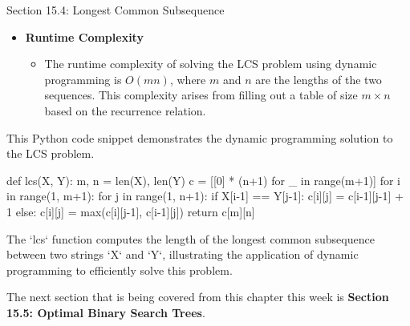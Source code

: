 \begin{notes}{Section 15.4: Longest Common Subsequence}
\begin{itemize}
        \item \textbf{Runtime Complexity}
        \begin{itemize}
            \item The runtime complexity of solving the LCS problem using dynamic programming is $O(mn)$, where $m$ and $n$ are the lengths of the two sequences. This complexity arises from filling 
            out a table of size $m \times n$ based on the recurrence relation.
        \end{itemize}
    \end{itemize}
    
    \begin{highlight}
        This Python code snippet demonstrates the dynamic programming solution to the LCS problem.
    \begin{code}[Python]
    def lcs(X, Y):
        m, n = len(X), len(Y)
        c = [[0] * (n+1) for _ in range(m+1)]
        for i in range(1, m+1):
            for j in range(1, n+1):
                if X[i-1] == Y[j-1]:
                    c[i][j] = c[i-1][j-1] + 1
                else:
                    c[i][j] = max(c[i][j-1], c[i-1][j])
        return c[m][n]
    \end{code}
        The `lcs` function computes the length of the longest common subsequence between two strings `X` and `Y`, illustrating the application of dynamic programming to efficiently solve this problem.
    \end{highlight}      
\end{notes}

The next section that is being covered from this chapter this week is \textbf{Section 15.5: Optimal Binary Search Trees}.

